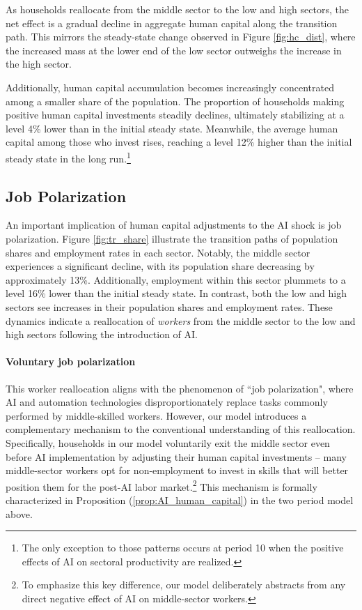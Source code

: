\documentclass[12pt]{article}
\begin{document}
As households reallocate from the middle sector to the low and high sectors, the net effect is a gradual decline in aggregate human capital along the transition path. This mirrors the steady-state change observed in Figure \ref{fig:hc_dist}, where the increased mass at the lower end of the low sector outweighs the increase in the high sector.

Additionally, human capital accumulation becomes increasingly concentrated among a smaller share of the population. The proportion of households making positive human capital investments steadily declines, ultimately stabilizing at a level 4\% lower than in the initial steady state. Meanwhile, the average human capital among those who invest rises, reaching a level 12\% higher than the initial steady state in the long run.\footnote{The only exception to those patterns occurs at period 10 when the positive effects of AI on sectoral productivity are realized.}



\subsection{Job Polarization}\label{sec:jobpolar}

An important implication of human capital adjustments to the AI shock is job polarization. 
Figure \ref{fig:tr_share} illustrate the transition paths of population shares and employment rates in each sector. Notably, the middle sector experiences a significant decline, with its population share decreasing by approximately 13\%. Additionally, employment within this sector plummets to a level 16\% lower than the initial steady state. In contrast, both the low and high sectors see increases in their population shares and employment rates. These dynamics indicate a reallocation of \emph{workers} from the middle sector to the low and high sectors following the introduction of AI.

\paragraph{Voluntary job polarization}
This worker reallocation aligns with the phenomenon of ``job polarization"\parencites{Goos2014}, where AI and automation technologies disproportionately replace tasks commonly performed by middle-skilled workers. However, our model introduces a complementary mechanism to the conventional understanding of this reallocation. Specifically, households in our model voluntarily exit the middle sector even before AI implementation by adjusting their human capital investments -- many middle-sector workers opt for non-employment to invest in skills that will better position
them for the post-AI labor market.\footnote{To emphasize this key difference, our model deliberately abstracts from any direct negative effect of AI on middle-sector workers.}   This mechanism is formally characterized in  Proposition (\ref{prop:AI_human_capital}) in the two period model above.
\end{document}
